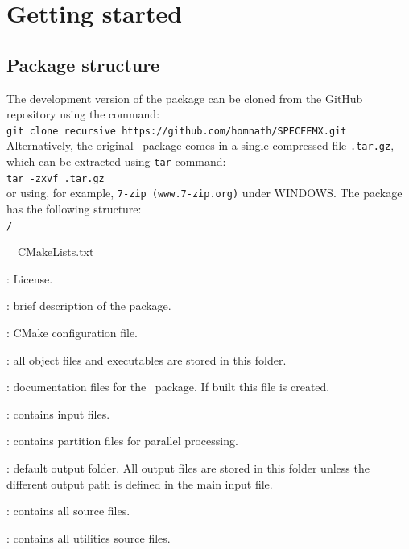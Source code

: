 \chapter{Getting started}
\section{Package structure}
The development version of the package can be cloned from the GitHub repository using the command:\\

\texttt{git clone \-\-recursive https://github.com/homnath/SPECFEMX.git}\\

Alternatively, the original \pack\ package comes in a single compressed file \linebreak\texttt{\pack.tar.gz}, which can be extracted using \texttt{tar} command:\\

\texttt{tar -zxvf \pack.tar.gz}\\

or using, for example, \texttt{7-zip (www.7-zip.org)} under WINDOWS. The package has the following structure:\\



\texttt{\pack/}
\begin{adescription}{~~CMakeLists.txt}
\item[~~COPYING]               : License.
\item[~~README]                : brief description of the package.
\item[~~CMakeLists.txt]        : CMake configuration file.
\item[~~bin/]                  : all object files and executables are stored in this folder.
\item[~~doc/]                  : documentation files for the \pack\ package. If built this file is created.
\item[~~input/]                : contains input files.
\item[~~partition/]            : contains partition files for parallel processing.
\item[~~output/]               : default output folder. All output files are stored in this folder unless the different output path is defined in the main input file.
\item[~~src/]                  : contains all source files.
\item[~~util/]                  : contains all utilities source files.
\end{adescription}

